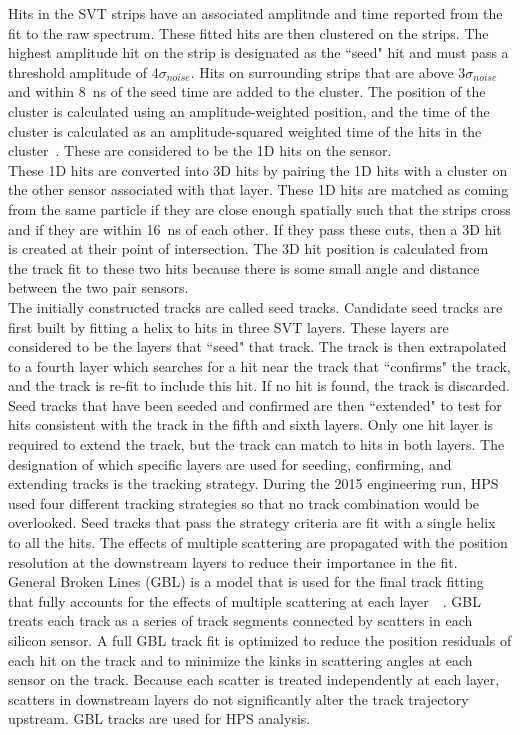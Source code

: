 Hits in the SVT strips have an associated amplitude and time reported from the fit to the raw spectrum. These fitted hits are then clustered on the strips. The highest amplitude hit on the strip is designated as the ``seed" hit and must pass a threshold amplitude of $4\sigma_{noise}$. Hits on surrounding strips that are above $3\sigma_{noise}$ and within 8~ns of the seed time are added to the cluster. The position of the cluster is calculated using an amplitude-weighted position, and the time of the cluster is calculated as an amplitude-squared weighted time of the hits in the cluster~\cite{uemura_search_2016}. These are considered to be the 1D hits on the sensor. \\
\indent These 1D hits are converted into 3D hits by pairing the 1D hits with a cluster on the other sensor associated with that layer. These 1D hits are matched as coming from the same particle if they are close enough spatially such that the strips cross and if they are within 16~ns of each other. If they pass these cuts, then a 3D hit is created at their point of intersection. The 3D hit position is calculated from the track fit to these two hits because there is some small angle and distance between the two pair sensors.\\
\indent The initially constructed tracks are called seed tracks. Candidate seed tracks are first built by fitting a helix to hits in three SVT layers. These layers are considered to be the layers that ``seed" that track. The track is then extrapolated to a fourth layer which searches for a hit near the track that ``confirms" the track, and the track is re-fit to include this hit. If no hit is found, the track is discarded. Seed tracks that have been seeded and confirmed are then ``extended" to test for hits consistent with the track in the fifth and sixth layers. Only one hit layer is required to extend the track, but the track can match to hits in both layers. The designation of which specific layers are used for seeding, confirming, and extending tracks is the tracking strategy. During the 2015 engineering run, HPS used four different tracking strategies so that no track combination would be overlooked. Seed tracks that pass the strategy criteria are fit with a single helix to all the hits. The effects of multiple scattering are propagated with the position resolution at the downstream layers to reduce their importance in the fit.\\
\indent General Broken Lines (GBL) is a model that is used for the final track fitting that fully accounts for the effects of multiple scattering at each layer~\cite{blobel_fast_2011}~\cite{kleinwort_general_2012}. GBL treats each track as a series of track segments connected by scatters in each silicon sensor. A full GBL track fit is optimized to reduce the position residuals of each hit on the track and to minimize the kinks in scattering angles at each sensor on the track. Because each scatter is treated independently at each layer, scatters in downstream layers do not significantly alter the track trajectory upstream. GBL tracks are used for HPS analysis. 

